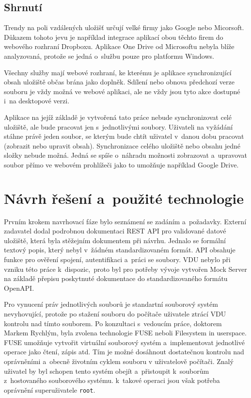 \section{Shrnutí}

Trendy na poli vzdálených uložišť určují velké firmy jako Google nebo Micorsoft. Důkazem tohoto jevu je například integrace aplikací obou těchto firem do webového
rozhraní Dropboxu. Aplikace One Drive od Microsoftu nebyla blíže analyzovaná, protože se jedná o službu pouze pro platformu Windows. 

Všechny služby mají webové rozhraní, ke kterému je aplikace synchronizující obsah uložiště občas brána jako doplněk. Sdílení nebo obnova předchozí verze souboru
je vždy možná ve webové aplikaci, ale ne vždy jsou tyto akce dostupné i na desktopové verzi.

Aplikace na jejíž základě je vytvořená tato práce nebude synchronizovat celé uložiště, ale bude pracovat jen s jednotlivými soubory. Uživateli na vyžádání stáhne 
právě jeden soubor, se kterým bude chtít uživatel v danou dobu pracovat (zobrazit nebo upravit obsah). Synchronizace celého uložiště nebo obsahu jedné složky nebude možná.
Jedná se spíše o náhradu možnosti zobrazovat a upravovat soubor přímo ve webovém prohlížeči jako to umožňuje například Google Drive.

\chapter{Návrh řešení a použité technologie}

Prvním krokem navrhovací fáze bylo seznámení se zadáním a požadavky. Externí zadavatel dodal podrobnou dokumentaci REST API pro validované datové uložiště, která
byla stěžejním dokumentem při návrhu. Jednalo se formální textový popis, který nebyl v žádném standardizovaném formát. API obsahuje funkce pro ověření spojení,
autentifikaci a práci se soubory. VDU nebylo při vzniku této práce k dispozic, proto byl pro potřeby vývoje vytvořen Mock Server na základě přepisu poskytnuté
dokumentace do standardizovaného formátu OpenAPI.

Pro vynucení práv jednotlivých souborů je standartní souborový systém nevyhovující, protože po stažení souboru do počítače uživatele ztrácí VDU kontrolu nad tímto
souborem. Po konzultaci s vedoucím práce, doktorem Markem Rychlým, byla zvolena technologie FUSE neboli Filesystem in userspace. FUSE umožňuje vytvořit virtuální
souborový systém a implementovat jednotlivé operace jako čtení, zápis atd. Tím je možné dosáhnout dostatečnou kontrolu nad oprávněními a obecně životním cyklem souboru
v uživatelově počítači. Znalý uživatel by byl schopen tento systém obejít a přistoupit k souborům z hostovaného souborového systému. k takové operaci jsou však potřeba 
oprávnění superuživatele \texttt{root}.

